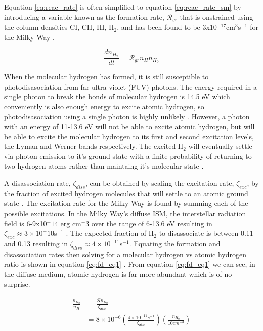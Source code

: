 Equation \ref{eq:reac_rate} is often simplified to equation \ref{eq:reac_rate_sm} by introducing a variable known as the formation rate, $\mathcal{R}_{gr}$ that is onstrained using the column densities CI, CII, HI, H$_2$, and has been found to be 3x10$^{-17}$cm$^3$s$^{-1}$ for the Milky Way \citep{jura1975, gry2002, wolfire2008}.

\begin{equation}\label{eq:reac_rate_sm}
  \frac{dn_{H_2}}{dt} = \mathcal{R}_{gr}n_H n_{H_0}
\end{equation}

When the molecular hydrogen has formed, it is still susceptible to photodisasociation from far ultra-violet (FUV) photons.  The energy required in a single photon to break the bonds of molecular hydrogen is 14.5 eV which conveniently is also enough energy to excite atomic hydrogen, so photodisasociation using a single photon is highly unlikely \citep{krumholz2014}.  However, a photon with an energy of 11-13.6 eV will not be able to excite atomic hydrogen, but will be able to excite the molecular hydrogen to its first and second excitation levels, the Lyman and Werner bands respectively.  The excited H$_2$ will eventually settle via photon emission to it's ground state with a finite probability of returning to two hydrogen atoms rather than maintaing it's molecular state \citep{krumholz2014}.

A disassociation rate, $\zeta_{diss}$, can be obtained by scaling the excitation rate, $\zeta_{exc}$, by the fraction of excited hydrogen molecules that will settle to an atomic ground state \citep{krumholz2014}.  The excitation rate for the Milky Way is found by summing each of the possible excitations.  In the Milky Way's diffuse ISM, the interstellar radiation field is 6-9x10$^-14$ erg cm$^-3$ over the range of 6-13.6 eV resulting in $\zeta_{exc} \approx 3\times10^-10$s$^{-1}$ \citep{draine2011}.  The expected fraction of H$_2$ to disassociate is between 0.11 and 0.13 resulting in $\zeta_{diss}\approx4\times10^{-11}$s$^{-1}$\citep{draine2011}.
Equating the formation and disassociation rates then solving for a molecular hydrogen vs atomic hydrogen ratio is shown in equation \ref{eq:fd_eq1} \citep{krumholz2014}.  From equation \ref{eq:fd_eq1} we can see, in the diffuse medium, atomic hydrogen is far more abundant which is of no surprise.

\begin{equation}\label{eq:fd_eq1}
  \begin{split}
    \frac{n_{H_2}}{n_H} & = \frac{\mathcal{R}n_{H_0}}{\zeta_{diss}} \\
                        & = 8\times10^{-6}\left(\frac{4\times10^{-11}s^{-1}}{\zeta_{diss}}\right)\left(\frac{n_{H_0}}{10cm^{-3}}\right)
  \end{split}
\end{equation}


